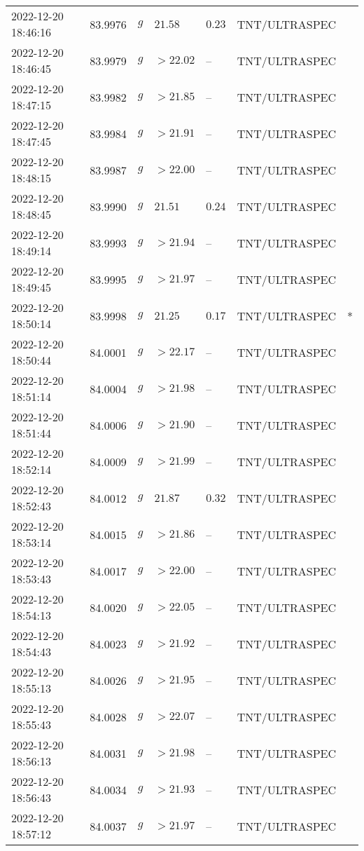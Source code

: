 \documentclass{nature_plusfigure}
\begin{document}
\begin{supplement}
\begin{center}
\begin{longtable}{lllllll}
2022-12-20 18:46:16 & 83.9976 & $g$ & $21.58$ & $0.23$ & TNT/ULTRASPEC &  \\ 
2022-12-20 18:46:45 & 83.9979 & $g$ & $>22.02$ & -- & TNT/ULTRASPEC &  \\ 
2022-12-20 18:47:15 & 83.9982 & $g$ & $>21.85$ & -- & TNT/ULTRASPEC &  \\ 
2022-12-20 18:47:45 & 83.9984 & $g$ & $>21.91$ & -- & TNT/ULTRASPEC &  \\ 
2022-12-20 18:48:15 & 83.9987 & $g$ & $>22.00$ & -- & TNT/ULTRASPEC &  \\ 
2022-12-20 18:48:45 & 83.9990 & $g$ & $21.51$ & $0.24$ & TNT/ULTRASPEC &  \\ 
2022-12-20 18:49:14 & 83.9993 & $g$ & $>21.94$ & -- & TNT/ULTRASPEC &  \\ 
2022-12-20 18:49:45 & 83.9995 & $g$ & $>21.97$ & -- & TNT/ULTRASPEC &  \\ 
2022-12-20 18:50:14 & 83.9998 & $g$ & $21.25$ & $0.17$ & TNT/ULTRASPEC & * \\ 
2022-12-20 18:50:44 & 84.0001 & $g$ & $>22.17$ & -- & TNT/ULTRASPEC &  \\ 
2022-12-20 18:51:14 & 84.0004 & $g$ & $>21.98$ & -- & TNT/ULTRASPEC &  \\ 
2022-12-20 18:51:44 & 84.0006 & $g$ & $>21.90$ & -- & TNT/ULTRASPEC &  \\ 
2022-12-20 18:52:14 & 84.0009 & $g$ & $>21.99$ & -- & TNT/ULTRASPEC &  \\ 
2022-12-20 18:52:43 & 84.0012 & $g$ & $21.87$ & $0.32$ & TNT/ULTRASPEC &  \\ 
2022-12-20 18:53:14 & 84.0015 & $g$ & $>21.86$ & -- & TNT/ULTRASPEC &  \\ 
2022-12-20 18:53:43 & 84.0017 & $g$ & $>22.00$ & -- & TNT/ULTRASPEC &  \\ 
2022-12-20 18:54:13 & 84.0020 & $g$ & $>22.05$ & -- & TNT/ULTRASPEC &  \\ 
2022-12-20 18:54:43 & 84.0023 & $g$ & $>21.92$ & -- & TNT/ULTRASPEC &  \\ 
2022-12-20 18:55:13 & 84.0026 & $g$ & $>21.95$ & -- & TNT/ULTRASPEC &  \\ 
2022-12-20 18:55:43 & 84.0028 & $g$ & $>22.07$ & -- & TNT/ULTRASPEC &  \\ 
2022-12-20 18:56:13 & 84.0031 & $g$ & $>21.98$ & -- & TNT/ULTRASPEC &  \\ 
2022-12-20 18:56:43 & 84.0034 & $g$ & $>21.93$ & -- & TNT/ULTRASPEC &  \\ 
2022-12-20 18:57:12 & 84.0037 & $g$ & $>21.97$ & -- & TNT/ULTRASPEC &  \\ 

\end{longtable}
\end{center}
\end{supplement}
\end{document}
